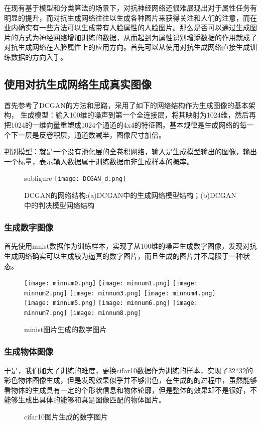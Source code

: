 在现有基于模型和分类算法的场景下，对抗神经网络还很难展现出对于属性任务有明显的提升，而对抗生成网络往往以生成各种图片来获得关注和人们的注意，而在业内确实有一些方法可以生成带有人脸属性的人脸图片。那么是否可以通过生成图片的方式为神经网络增加训练的数据，从而起到为属性识别增添数据的作用就成了对抗生成网络在人脸属性上的应用方向。首先可以从使用对抗生成网络直接生成训练数据的方向入手。
\subsection{使用对抗生成网络生成真实图像}
首先参考了DCGAN\cite{DCGAN}的方法和思路，采用了如下的网络结构作为生成图像的基本架构， 生成模型：输入100维的噪声到第一个全连接层，将其映射为1024维，然后再把1024的一维向量重塑成1024个通道的4x4的特征图。基本规律是生成网络的每一个下一层是反卷积层，通道数减半，图像尺寸加倍。

判别模型：就是一个没有池化层的全卷积网络，输入是生成模型输出的图像，输出一个标量，表示输入数据属于训练数据而非生成样本的概率。
\begin{figure}[h]
  \centering
  subfigure{
  \texttt{[image: DCGAN\_d.png]}
  }
  \caption{DCGAN的网络结构:(a)DCGAN中的生成网络模型结构；(b)DCGAN中的判决模型网络结构}
\end{figure}

\subsubsection{生成数字图像}
首先使用mnist数据\cite{MNIST}作为训练样本，实现了从100维的噪声生成数字图像，发现对抗生成网络确实可以生成较为逼真的数字图片，而且生成的图片并不局限于一种状态。
\begin{figure}[!ht]
 \centering 
	\texttt{[image: minnum0.png]}
	\texttt{[image: minnum1.png]}
	\texttt{[image: minnum2.png]}
	\texttt{[image: minnum3.png]}
	\texttt{[image: minnum4.png]}
	\texttt{[image: minnum5.png]}
	\texttt{[image: minnum6.png]}
	\texttt{[image: minnum7.png]}
	\texttt{[image: minnum8.png]}
	\caption{minist图片生成的数字图片}
\end{figure}

\subsubsection{生成物体图像}
于是，我们加大了训练的难度，更换cifar10\cite{CIFAR10}数据作为训练的样本，实现了32*32的彩色物体图像生成，但是发现效果似乎并不够出色，在生成的的过程中，虽然能够看物体的生成具有一定的个形状信息和物体轮廓，但是整体的效果却不是很好，不能够生成出具体的能够和真是图像匹配的物体图片。
\begin{figure}[!ht]
 \centering 
	\caption{cifar10图片生成的数字图片}
\end{figure}

